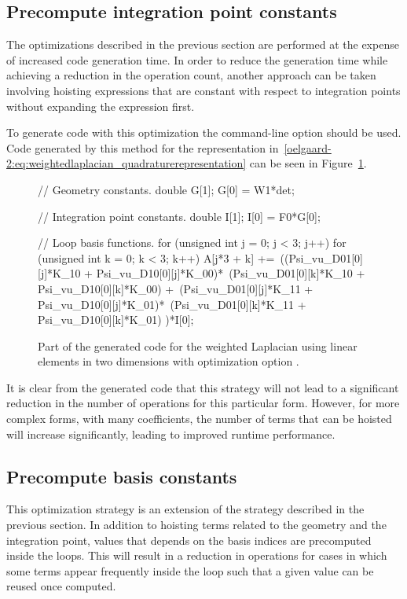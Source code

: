 \subsection{Precompute integration point constants}

The optimizations described in the previous section are performed at
the expense of increased code generation time.  In order to reduce the
generation time while achieving a reduction in the operation count,
another approach can be taken involving hoisting expressions that
are constant with respect to integration points without expanding the
expression first.

To generate code with this optimization the \ffc{}
command-line option  should
be used.  Code generated by this method for the representation
in~\eqref{oelgaard-2:eq:weightedlaplacian_quadraturerepresentation}
can be seen in Figure~\ref{oelgaard-2:fig:O_ip_code}.
%
\begin{figure}
\begin{c++}
// Geometry constants.
double G[1];
G[0] = W1*det;

// Integration point constants.
double I[1];
I[0] = F0*G[0];

// Loop basis functions.
for (unsigned int j = 0; j < 3; j++)
{
  for (unsigned int k = 0; k < 3; k++)
  {
    A[j*3 + k] +=\
    ((Psi_vu_D01[0][j]*K_10 + Psi_vu_D10[0][j]*K_00)*\
     (Psi_vu_D01[0][k]*K_10 + Psi_vu_D10[0][k]*K_00) +\
     (Psi_vu_D01[0][j]*K_11 + Psi_vu_D10[0][j]*K_01)*\
     (Psi_vu_D01[0][k]*K_11 + Psi_vu_D10[0][k]*K_01)
    )*I[0];
  }
}
\end{c++}
\caption{Part of the generated code for the weighted Laplacian using
         linear elements in two dimensions with optimization option
         .}
\label{oelgaard-2:fig:O_ip_code}
\end{figure}
%
It is clear from the generated code that this strategy will not lead to
a significant reduction in the number of operations for this particular
form. However, for more complex forms, with many coefficients, the number
of terms that can be hoisted will increase significantly, leading to
improved runtime performance.
\subsection{Precompute basis constants}

This optimization strategy is an extension of the strategy described in
the previous section.  In addition to hoisting terms related
to the geometry and the integration point, values that depends on the
basis indices are precomputed inside the loops.  This will result in a
reduction in operations for cases in which some terms appear frequently
inside the loop such that a given value can be reused once computed.

